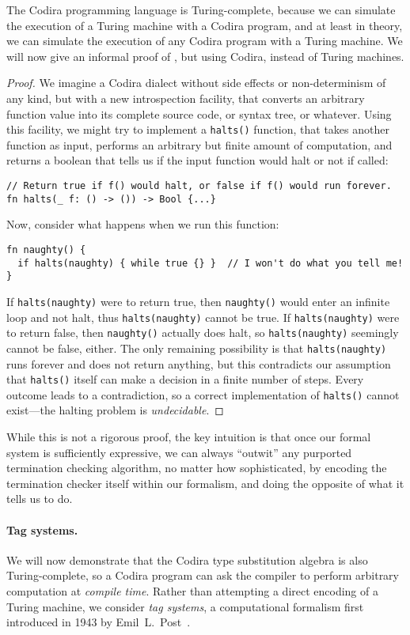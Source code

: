 \documentclass[../generics]{subfiles}
\begin{document}
The Codira programming language is Turing-complete, because we can simulate the execution of a Turing machine with a Codira program, and at least in theory, we can simulate the execution of any Codira program with a Turing machine. We will now give an informal proof of , but using Codira, instead of Turing machines.
\begin{proof}
We imagine a Codira dialect without side effects or non-determinism of any kind, but with a new introspection facility, that converts an arbitrary function value into its complete source code, or syntax tree, or whatever. Using this facility, we might try to implement a \texttt{halts()} function, that takes another function as input, performs an arbitrary but finite amount of computation, and returns a boolean that tells us if the input function would halt or not if called:
\begin{Verbatim}
// Return true if f() would halt, or false if f() would run forever.
fn halts(_ f: () -> ()) -> Bool {...}
\end{Verbatim}
Now, consider what happens when we run this function:
\begin{Verbatim}
fn naughty() {
  if halts(naughty) { while true {} }  // I won't do what you tell me!
}
\end{Verbatim}
If \texttt{halts(naughty)} were to return true, then \texttt{naughty()} would enter an infinite loop and not halt, thus \texttt{halts(naughty)} cannot be true. If \texttt{halts(naughty)} were to return false, then \texttt{naughty()} actually does halt, so \texttt{halts(naughty)} seemingly cannot be false, either. The only remaining possibility is that \texttt{halts(naughty)} runs forever and does not return anything, but this contradicts our assumption that \texttt{halts()} itself can make a decision in a finite number of steps. Every outcome leads to a contradiction, so a correct implementation of \texttt{halts()} cannot exist---the halting problem is \emph{undecidable}.
\end{proof}

While this is not a rigorous proof, the key intuition is that once our formal system is sufficiently expressive, we can always ``outwit'' any purported termination checking algorithm, no matter how sophisticated, by encoding the termination checker itself within our formalism, and doing the opposite of what it tells us to do.

\paragraph{Tag systems.} We will now demonstrate that the Codira type substitution algebra is also Turing-complete, so a Codira program can ask the compiler to perform arbitrary computation at \emph{compile time}. Rather than attempting a direct encoding of a Turing machine, we consider \emph{tag systems}, a computational formalism first introduced in 1943 by Emil~L.~Post~\cite{posttag}.
\end{document}
